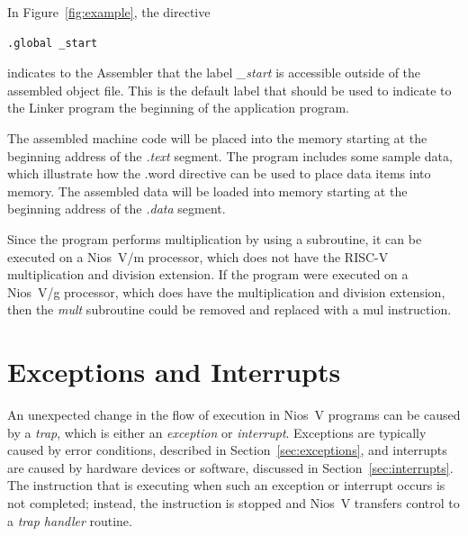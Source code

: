 \documentclass[11pt, twoside, pdftex]{article}
\begin{document}
\newpage
In Figure~\ref{fig:example}, the directive
\begin{center}
\begin{lstlisting}[style=defaultNiosVStyle]
        .global _start
\end{lstlisting}
\end{center} 
\vspace{-\baselineskip}
\noindent
indicates to the Assembler that the label {\it \_start} is accessible outside of the
assembled object file. This is the default label that should be used to indicate to
the Linker program the beginning of the application program.

The assembled machine code will be placed into the memory starting 
at the beginning address of the {\it .text} segment.
The program includes some sample data, which illustrate how the {\sf .word} directive 
can be used to place data items into memory. The assembled data will be loaded into 
memory starting at the beginning address of the {\it .data} segment.

Since the program performs multiplication by using a subroutine, it can be executed on a
Nios~V/m processor, which does not have the RISC-V multiplication and division extension.
If the program were executed on a Nios~V/g processor, which does have the multiplication
and division extension, then the {\it mult} subroutine could be removed and replaced with a
{\sf mul} instruction. 

\section{Exceptions and Interrupts}
\label{sec:traps}

An unexpected change in the flow of execution in Nios~V programs can be caused by a
{\it trap}, which is either an
{\it exception} or {\it interrupt}. Exceptions are typically caused by error conditions,
described in Section~\ref{sec:exceptions}, and interrupts are caused by hardware devices
or software, discussed in Section~\ref{sec:interrupts}. The instruction that is executing 
when such an exception or interrupt occurs is not completed; instead, the instruction is
stopped and Nios~V transfers control to a {\it trap handler} routine.
\end{document}
